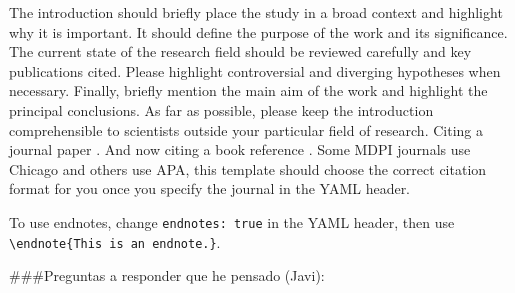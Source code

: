 \documentclass[notspecified,article,submit,moreauthors,pdftex]{Definitions/mdpi}
\begin{document}
The introduction should briefly place the study in a broad context and
highlight why it is important. It should define the purpose of the work
and its significance. The current state of the research field should be
reviewed carefully and key publications cited. Please highlight
controversial and diverging hypotheses when necessary. Finally, briefly
mention the main aim of the work and highlight the principal
conclusions. As far as possible, please keep the introduction
comprehensible to scientists outside your particular field of research.
Citing a journal paper
\citep{bertrand-krajewski_distribution_1998, leutnant_stormwater_2016}.
And now citing a book reference \citet{gujer_systems_2008}. Some MDPI
journals use Chicago and others use APA, this template should choose the
correct citation format for you once you specify the journal in the YAML
header.

To use endnotes, change \texttt{endnotes:\ true} in the YAML header,
then use \texttt{\textbackslash{}endnote\{This\ is\ an\ endnote.\}}.

\#\#\#Preguntas a responder que he pensado (Javi):
\end{document}
